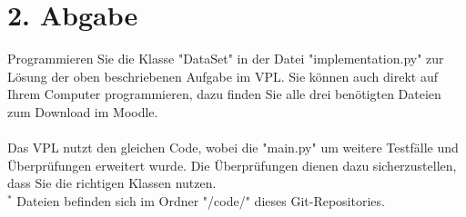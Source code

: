 \documentclass[
 oneside, %
 12pt, %
 a4paper, %
 parskip=full %
]{scrartcl}
\begin{document}
\section*{2. Abgabe}
Programmieren Sie die Klasse "DataSet" in der Datei "implementation.py" zur Lösung der oben beschriebenen Aufgabe im VPL.
Sie können auch direkt auf Ihrem Computer programmieren, dazu finden Sie alle drei benötigten Dateien zum Download im Moodle.\\
\\
Das VPL nutzt den gleichen Code, wobei die "main.py" um weitere Testfälle und Überprüfungen erweitert wurde.
Die Überprüfungen dienen dazu sicherzustellen, dass Sie die richtigen Klassen nutzen.\\
$^*$ Dateien befinden sich im Ordner "/code/" dieses Git-Repositories.\\
\end{document}
